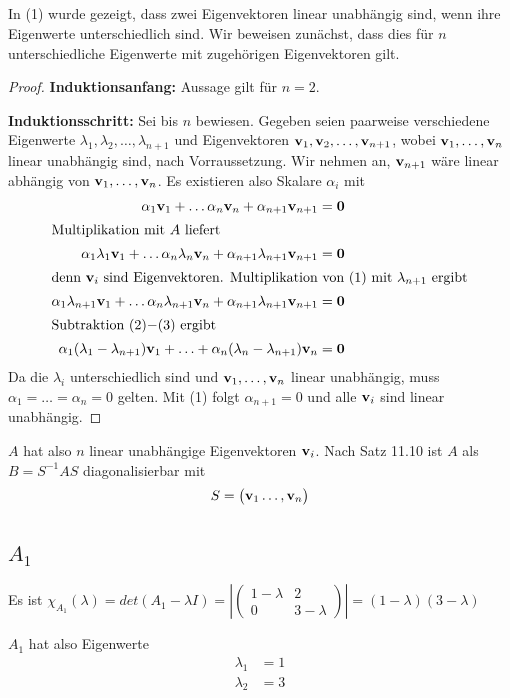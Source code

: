 \documentclass{../mfa}
\begin{document}
\subsection{}

In (1) wurde gezeigt, dass zwei Eigenvektoren linear unabhängig sind, wenn ihre
Eigenwerte unterschiedlich sind. Wir beweisen zunächst, dass dies für $n$
unterschiedliche Eigenwerte mit zugehörigen Eigenvektoren gilt.

\begin{proof}

\textbf{Induktionsanfang:} Aussage gilt für $n=2$.

\textbf{Induktionsschritt:} Sei bis $n$ bewiesen. Gegeben seien paarweise
verschiedene Eigenwerte $\lambda_1, \lambda_2, \ldots, \lambda_{n+1}$ und
Eigenvektoren $\v{1}, \v{2}, \ldots, \v{n+1}$, wobei $\v{1}, \ldots, \v{n}$
linear unabhängig sind, nach Vorraussetzung. Wir nehmen an, $\v{n+1}$ wäre
linear abhängig von $\v{1}, \ldots, \v{n}$. Es existieren also Skalare
$\alpha_i$ mit 
\setcounter{equation}{0}
\begin{align}
   \alpha_1 \v{1} + \ldots \alpha_n \v{n} + \alpha_{n+1} \v{n+1} &= \mbf{0} \\
   \intertext{Multiplikation mit $A$ liefert}
   \alpha_1 \lambda_1 \v{1} + \ldots \alpha_n \lambda_n \v{n} + \alpha_{n+1} \lambda_{n+1} \v{n+1} &= \mbf{0} \\
   \intertext{denn $\v{i}$ sind Eigenvektoren. Multiplikation von (1) mit
   $\lambda_{n+1}$ ergibt}
   \alpha_1 \lambda_{n+1} \v{1} + \ldots \alpha_n \lambda_{n+1} \v{n} + \alpha_{n+1} \lambda_{n+1} \v{n+1} &= \mbf{0} \\
   \intertext{Subtraktion (2)$-$(3) ergibt}
   \alpha_1(\lambda_1 - \lambda_{n+1})\v{1} + \ldots + \alpha_n (\lambda_n -
   \lambda_{n+1})\v{n} &= \mbf{0}
\end{align}
Da die $\lambda_i$ unterschiedlich sind und $\v{1}, \ldots, \v{n}$ linear
unabhängig, muss $\alpha_1 = \ldots = \alpha_n = 0$ gelten. Mit (1) folgt
$\alpha_{n+1} = 0$ und alle $\v{i}$ sind linear unabhängig. 
\end{proof}

$A$ hat also $n$ linear unabhängige
Eigenvektoren $\mathbf{v}_i$. Nach Satz 11.10 ist $A$ als $B=S^{-1} A S$ diagonalisierbar mit
\begin{equation*}
   S = \begin{pmatrix}
      \mathbf{v}_1 \ldots, \mathbf{v}_n
   \end{pmatrix}
\end{equation*}

\section{}
\subsection{$A_1$}

Es ist $\chi_{A_1}(\lambda) = det(A_1 - \lambda I) = 
\left|
\begin{pmatrix}
   1-\lambda & 2 \\
   0 & 3 - \lambda
\end{pmatrix}
\right|= (1-\lambda)(3-\lambda)$

$A_1$ hat also Eigenwerte 
\begin{align*}
   \lambda_1 &= 1 \\
   \lambda_2 &= 3 
\end{align*}
\end{document}
